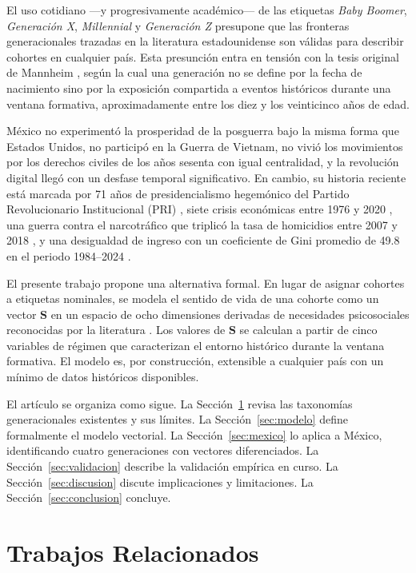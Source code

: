 \documentclass[conference,spanish]{IEEEtran}
\begin{document}
El uso cotidiano ---y progresivamente académico--- de las etiquetas \textit{Baby Boomer}, \textit{Generación X}, \textit{Millennial} y \textit{Generación Z} presupone que las fronteras generacionales trazadas en la literatura estadounidense \cite{strauss1991} son válidas para describir cohortes en cualquier país. Esta presunción entra en tensión con la tesis original de Mannheim \cite{mannheim1928}, según la cual una generación no se define por la fecha de nacimiento sino por la exposición compartida a eventos históricos durante una ventana formativa, aproximadamente entre los diez y los veinticinco años de edad.

México no experimentó la prosperidad de la posguerra bajo la misma forma que Estados Unidos, no participó en la Guerra de Vietnam, no vivió los movimientos por los derechos civiles de los años sesenta con igual centralidad, y la revolución digital llegó con un desfase temporal significativo. En cambio, su historia reciente está marcada por 71 años de presidencialismo hegemónico del Partido Revolucionario Institucional (PRI) \cite{banxico2024}, siete crisis económicas entre 1976 y 2020 \cite{banxico2024}, una guerra contra el narcotráfico que triplicó la tasa de homicidios entre 2007 y 2018 \cite{inegi2024homicidios}, y una desigualdad de ingreso con un coeficiente de Gini promedio de 49.8 en el periodo 1984--2024 \cite{worldbank2024}.

El presente trabajo propone una alternativa formal. En lugar de asignar cohortes a etiquetas nominales, se modela el sentido de vida de una cohorte como un vector $\mathbf{S}$ en un espacio de ocho dimensiones derivadas de necesidades psicosociales reconocidas por la literatura \cite{maslow1943, inglehart1977}. Los valores de $\mathbf{S}$ se calculan a partir de cinco variables de régimen que caracterizan el entorno histórico durante la ventana formativa. El modelo es, por construcción, extensible a cualquier país con un mínimo de datos históricos disponibles.

El artículo se organiza como sigue. La Sección~\ref{sec:related} revisa las taxonomías generacionales existentes y sus límites. La Sección~\ref{sec:modelo} define formalmente el modelo vectorial. La Sección~\ref{sec:mexico} lo aplica a México, identificando cuatro generaciones con vectores diferenciados. La Sección~\ref{sec:validacion} describe la validación empírica en curso. La Sección~\ref{sec:discusion} discute implicaciones y limitaciones. La Sección~\ref{sec:conclusion} concluye.

\section{Trabajos Relacionados}
\label{sec:related}
\end{document}
